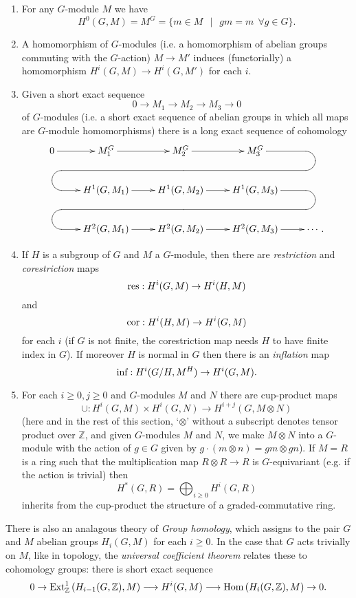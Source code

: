 \documentclass[11pt]{amsart}
\numberwithin{equation}{section}
\theoremstyle{remark}
\theoremstyle{remark}
\theoremstyle{remark}
\theoremstyle{definition}
\theoremstyle{definition}
\theoremstyle{definition}
\theoremstyle{definition}
\theoremstyle{definition}
\theoremstyle{definition}
\begin{document}
\begin{enumerate}
\item For any $G$-module $M$ we have
\[H^0(G,M)=M^G=\{m\in M~~\mid~~gm=m~~\forall g\in G\}.\]
\item A homomorphism of $G$-modules (i.e. a homomorphism of abelian groups commuting with the $G$-action) $M\rightarrow M'$ induces (functorially) a homomorphism $H^i(G,M)\rightarrow H^i(G,M')$ for each $i$.
\item  Given a short exact sequence 
\[0\rightarrow M_1\rightarrow M_2\rightarrow M_3\rightarrow 0\]
of $G$-modules (i.e. a short exact sequence of abelian groups in which all maps are $G$-module homomorphisms) there is a long exact sequence of cohomology
\[\xymatrix{
0\ar[r]^>>>>>{}& M_1^G\ar[r]^>>>>>{} 
& M_2^G\ar[r]^>>>>>{} 
&M_3^G\ar `[dr] `[r] `[llld]|{}  `[rd][lrdlllr]  &\\
& H^1(G,M_1)  \ar[r]^>>>>>{} & H^1(G,M_2) \ar[r]^>>>>>{} 
&H^1(G,M_3)\ar `[dr] `[r] `[llld]|{}  `[rd][lrdlllr] &\\
&H^2(G,M_1) \ar[r]^>>>>>{} & H^2(G,M_2)\ar[r]^>>>>>{} 
& H^2(G,M_3)\ar[r]&\cdots.}\] 
\item If $H$ is a subgroup of $G$ and $M$ a $G$-module, then there are \textit{restriction} and \textit{corestriction} maps
\[\textup{res}:H^i(G,M)\rightarrow H^i(H,M)\]
and
\[\textup{cor}:H^i(H,M)\rightarrow H^i(G,M)\]
for each $i$ (if $G$ is not finite, the corestriction map needs $H$ to have finite index in $G$). If moreover $H$ is normal in $G$ then there is an \textit{inflation} map
\[\textup{inf}:H^i(G/H,M^H)\rightarrow H^i(G,M).\]
\item For each $i\geq 0,j\geq 0$ and $G$-modules $M$ and $N$ there are cup-product maps
\[\cup:H^i(G,M)\times H^i(G,N)\rightarrow H^{i+j}(G,M\otimes N)\]
(here and in the rest of this section, `$\otimes$' without a subscript denotes tensor product over $\mathbb{Z}$, and given $G$-modules $M$ and $N$, we make $M\otimes N$ into a $G$-module with the action of $g\in G$ given by $g\cdot (m\otimes n)=gm\otimes gn$). If $M=R$ is a ring such that the multiplication map $R\otimes R\rightarrow R$ is $G$-equivariant (e.g. if the action is trivial) then 
\[H^*(G,R)=\bigoplus_{i\geq 0}H^i(G,R)\]
inherits from the cup-product the structure of a graded-commutative ring.
\end{enumerate}

There is also an analagous theory of \textit{Group homology}, which assigns to the pair $G$ and $M$ abelian groups $H_i(G,M)$ for each $i\geq 0$. In the case that $G$ acts trivially on $M$, like in topology, the \textit{universal coefficient theorem} relates these to cohomology groups: there is short exact sequence
\[0\rightarrow \textup{Ext}^1_\mathbb{Z}\left(H_{i-1}(G,\mathbb{Z}),M\right)\longrightarrow H^i(G,M)\longrightarrow \textup{Hom}\left(H_i(G,\mathbb{Z}),M\right)\rightarrow 0.\]
\end{document}
